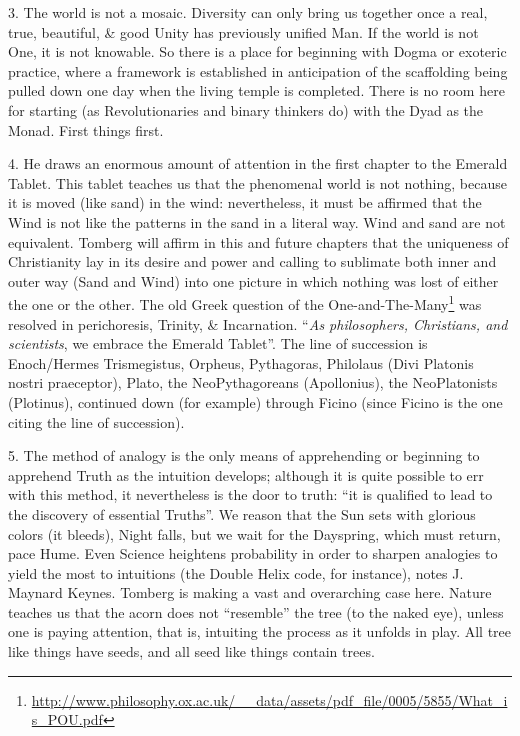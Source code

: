 3. The world is not a mosaic. Diversity can only bring us together once a real, true, beautiful, \& good Unity has previously unified Man. If the world is not One, it is not knowable. So there is a place for beginning with Dogma or exoteric practice, where a framework is established in anticipation of the scaffolding being pulled down one day when the living temple is completed. There is no room here for starting (as Revolutionaries and binary thinkers do) with the Dyad as the Monad. First things first.

4. He draws an enormous amount of attention in the first chapter to the Emerald Tablet. This tablet teaches us that the phenomenal world is not nothing, because it is moved (like sand) in the wind: nevertheless, it must be affirmed that the Wind is not like the patterns in the sand in a literal way. Wind and sand are not equivalent. Tomberg will affirm in this and future chapters that the uniqueness of Christianity lay in its desire and power and calling to sublimate both inner and outer way (Sand and Wind) into one picture in which nothing was lost of either the one or the other. The old Greek question of the One-and-The-Many\footnote{\url{http://www.philosophy.ox.ac.uk/__data/assets/pdf_file/0005/5855/What_is_POU.pdf}} was resolved in perichoresis, Trinity, \& Incarnation. ``\emph{As philosophers, Christians, and scientists}, we embrace the Emerald Tablet''. The line of succession is Enoch/Hermes Trismegistus, Orpheus, Pythagoras, Philolaus (Divi Platonis nostri praeceptor), Plato, the NeoPythagoreans (Apollonius), the NeoPlatonists (Plotinus), continued down (for example) through Ficino (since Ficino is the one citing the line of succession).

5. The method of analogy is the only means of apprehending or beginning to apprehend Truth as the intuition develops; although it is quite possible to err with this method, it nevertheless is the door to truth: ``it is qualified to lead to the discovery of essential Truths''. We reason that the Sun sets with glorious colors (it bleeds), Night falls, but we wait for the Dayspring, which must return, pace Hume. Even Science heightens probability in order to sharpen analogies to yield the most to intuitions (the Double Helix code, for instance), notes J. Maynard Keynes. Tomberg is making a vast and overarching case here. Nature teaches us that the acorn does not ``resemble'' the tree (to the naked eye), unless one is paying attention, that is, intuiting the process as it unfolds in play. All tree like things have seeds, and all seed like things contain trees.

